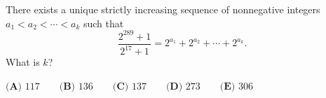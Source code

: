 There exists a unique strictly increasing sequence of nonnegative integers $a_1<a_2<\cdots<a_k$ such that
\[\dfrac{2^{289}+1}{2^{17}+1}=2^{a_1}+2^{a_2}+\cdots+2^{a_k}.\]
What is $k$?

$\textbf{(A) }117\qquad\textbf{(B) }136\qquad\textbf{(C) }137\qquad\textbf{(D) }273\qquad\textbf{(E) }306$
